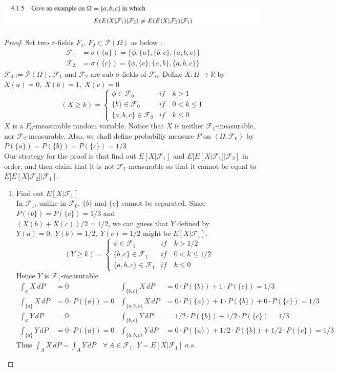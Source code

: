 \documentclass[12pt, A4]{article}
\newcommand{\R}{\mathbb{R}}
\newcommand{\F}{\mathcal{F}}
\begin{document}
\includegraphics{Exer4.1.5.JPG}
\begin{proof}
	Set two $\sigma$-fields $F_1,\, F_2\subset \mathcal{P}(\Omega)$  as below : 
	\begin{align*}
		\F_1 &=\sigma(\{a\})= \big\{\phi, \{a\}, \{b,c\}, \{a,b,c\}\big\} \\ \F_2 &= \sigma(\{c\})= \big\{\phi, \{c\}, \{a,b\}, \{a,b,c\}\big\}
	\end{align*}
	$\F_0:=\mathcal{P}(\Omega)$. $\F_1$ and $\F_2$ are sub $\sigma$-fields of $\F_0$. Define $X : \Omega \rightarrow \R$ by $X(a)=0,\; X(b)=1, \; X(c)=0$ \\ $$(X\geq k) = \begin{cases}
		\phi \in \F_0 & if\quad k>1 \\ \{b\}\in \F_0 & if\quad 0<k\leq 1 \\  \{a,b,c\}\in \F_0 & if\quad k\leq 0 
	\end{cases}$$ $X$ is a $F_0$-measurable random variable. Notice that $X$ is neither $\F_1$-measurable, nor $\F_2$-measurable. Also, we shall define probabiliy measure $P$ on $(\Omega, \F_0)$ by $P(\{a\})=P(\{b\})=P(\{c\})=1/3$\\
	Our strategy for the proof is that find out $E[X|\F_1]$ and $E[E[X|\F_1]|\F_2]$ in order, and then claim that it is not $\F_1$-measurable so that it cannot be equal to $E[E[X|\F_2]|\F_1]$.\\
	\begin{enumerate}
		\item Find out $E[X|\F_1]$\\
		In $\F_1$, unlike in $\F_0$, $\{b\}$ and $\{c\}$ cannot be separated. Since $P(\{b\})=P(\{c\})=1/3$ and \\$(X(b)+X(c))/2=1/2$, we can guess that $Y$ defined by $Y(a)=0, \; Y(b)=1/2,\; Y(c)=1/2$ might be $E[X|\F_1]$. 
		$$(Y\geq k) = 
		\begin{cases}
			\phi \in \F_1 & if\quad k>1/2 \\ \{b,c\}\in \F_1 & if \quad 0<k\leq 1/2 \\  \{a,b,c\}\in \F_1 & if\quad k\leq 0 
		\end{cases}$$
		Hence $Y$ is $\F_1$-measurable.
		\begin{align*}
			\int_\phi X\, dP &= 0	 &	 \int_{\{b,c\}} X\, dP&= 0\cdot P(\{b\})+1\cdot P(\{c\})=1/3   \\
			 \int_{\{a\}} X\, dP&= 0\cdot P(\{a\})=0	&	 \int_{\{a,b,c\}} X\,dP &=0\cdot P(\{a\})+1\cdot P(\{b\})+0\cdot P(\{c\})=1/3 \\
			 \int_\phi Y\, dP &= 0	 &	 \int_{\{b,c\}} Y\, dP&= 1/2\cdot P(\{b\})+1/2\cdot P(\{c\})=1/3   \\
			 \int_{\{a\}} Y\, dP&= 0\cdot P(\{a\})=0	&	 \int_{\{a,b,c\}} Y\,dP &=0\cdot P(\{a\})+1/2\cdot P(\{b\})+1/2\cdot P(\{c\})=1/3 
		\end{align*}
		Thus $\int_A X\, dP=\int_A Y\, dP \quad \forall \, A\in \F_1$. \quad $Y=E[X|\F_1]\; a.s.$
		

\end{enumerate}
\end{proof}
\end{document}
